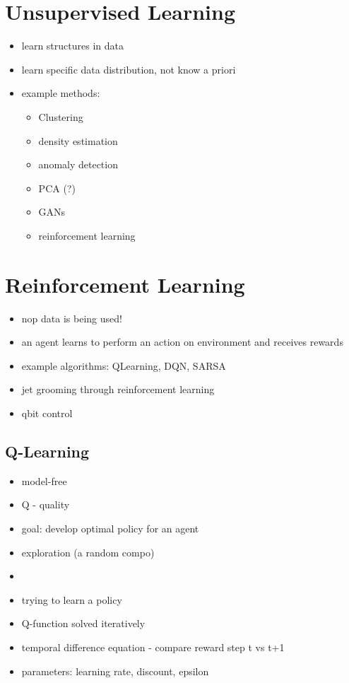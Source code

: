 \section{Unsupervised Learning}
\begin{itemize}
  \item learn structures in data
  \item learn specific data distribution, not know a priori
  \item example methods:
\begin{itemize}
  \item Clustering
  \item density estimation
  \item anomaly detection
  \item PCA (?)
  \item GANs
  \item reinforcement learning
\end{itemize}
\end{itemize}

\section{Reinforcement Learning}
\begin{itemize}
  \item nop data is being used!
  \item an agent learns to perform an action on environment and receives rewards
  \item example algorithms: QLearning, DQN, SARSA
  \item jet grooming through reinforcement learning
  \item qbit control
\end{itemize}


\subsection{Q-Learning}
\begin{itemize}
  \item model-free
  \item Q - quality
  \item goal: develop optimal policy for an agent
  \item exploration (a random compo)
  \item 
  \item trying to learn a policy
  \item Q-function solved iteratively
  \item temporal difference equation - compare reward step t vs t+1
  \item parameters: learning rate, discount, epsilon
\end{itemize}
